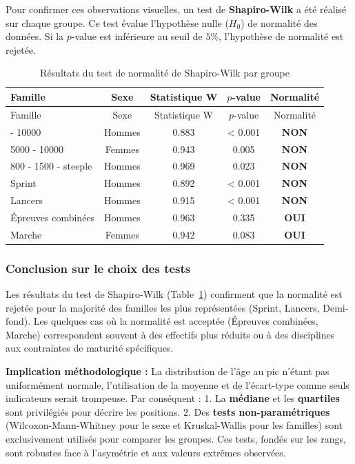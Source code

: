 \documentclass[
  french,
  11pt,
  a4paper,
]{article}
\begin{document}
Pour confirmer ces observations visuelles, un test de
\textbf{Shapiro-Wilk} a été réalisé sur chaque groupe. Ce test évalue
l'hypothèse nulle (\(H_0\)) de normalité des données. Si la \(p\)-value
est inférieure au seuil de \(5\%\), l'hypothèse de normalité est
rejetée.

\begin{longtable}[]{@{}lcccc@{}}
\caption{Résultats du test de normalité de Shapiro-Wilk par
groupe}\label{tbl-shapiro}\tabularnewline
\toprule\noalign{}
Famille & Sexe & Statistique W & \(p\)-value & Normalité \\
\midrule\noalign{}
\endfirsthead
\toprule\noalign{}
Famille & Sexe & Statistique W & \(p\)-value & Normalité \\
\midrule\noalign{}
\endhead
\bottomrule\noalign{}
\endlastfoot
5000 - 10000 & Hommes & 0.883 & \textless{} 0.001 & \textbf{NON} \\
5000 - 10000 & Femmes & 0.943 & 0.005 & \textbf{NON} \\
800 - 1500 - steeple & Hommes & 0.969 & 0.023 & \textbf{NON} \\
Sprint & Hommes & 0.892 & \textless{} 0.001 & \textbf{NON} \\
Lancers & Hommes & 0.915 & \textless{} 0.001 & \textbf{NON} \\
Épreuves combinées & Hommes & 0.963 & 0.335 & \textbf{OUI} \\
Marche & Femmes & 0.942 & 0.083 & \textbf{OUI} \\
\end{longtable}

\subsubsection*{Conclusion sur le choix des
tests}\label{conclusion-sur-le-choix-des-tests}

Les résultats du test de Shapiro-Wilk (Table~\ref{tbl-shapiro})
confirment que la normalité est rejetée pour la majorité des familles
les plus représentées (Sprint, Lancers, Demi-fond). Les quelques cas où
la normalité est acceptée (Épreuves combinées, Marche) correspondent
souvent à des effectifs plus réduits ou à des disciplines aux
contraintes de maturité spécifiques.

\textbf{Implication méthodologique :} La distribution de l'âge au pic
n'étant pas uniformément normale, l'utilisation de la moyenne et de
l'écart-type comme seuls indicateurs serait trompeuse. Par conséquent :
1. La \textbf{médiane} et les \textbf{quartiles} sont privilégiés pour
décrire les positions. 2. Des \textbf{tests non-paramétriques}
(Wilcoxon-Mann-Whitney pour le sexe et Kruskal-Wallis pour les familles)
sont exclusivement utilisés pour comparer les groupes. Ces tests, fondés
sur les rangs, sont robustes face à l'asymétrie et aux valeurs extrêmes
observées.
\end{document}
